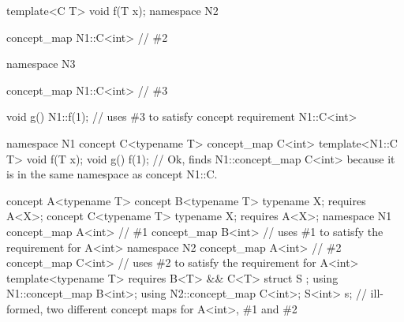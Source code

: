 \documentclass[american]{book}
\begin{document}
\begin{paras}
\begin{codeblock}
{  template<C T> void f(T x);
}
namespace N2 {
  concept_map N1::C<int> { } // \#2

  namespace N3 {
    concept_map N1::C<int> { } // \#3

    void g() { 
      N1::f(1); // uses \#3 to satisfy concept requirement N1::C<int>
    }
  }
}
\end{codeblock}
\addedConcepts{\mbox{\exitexample} \mbox{\exitnote}}

\pnum 
{}
\addedConcepts{\mbox{\enterexample}}
\begin{codeblock}
namespace N1 {
  concept C<typename T> { }
  concept_map C<int> { }
}
template<N1::C T> void f(T x);
void g() { 
  f(1); // Ok, finds N1::concept_map C<int> because it is in the same namespace as concept N1::C.
} 
\end{codeblock}
\addedConcepts{\mbox{\exitexample}}\addedConcepts{\mbox{\exitnote}}

\pnum
{}
\color{addclr}
\begin{codeblock}
concept A<typename T> { }
concept B<typename T> {
  typename X;
  requires A<X>;
}
concept C<typename T> {
  typename X;
  requires A<X>;
}
namespace N1 {
  concept_map A<int> { }  // \#1
  concept_map B<int> { }  // uses \#1 to satisfy the requirement for A<int>
}
namespace N2 {
  concept_map A<int> { }  // \#2
  concept_map C<int> { }  // uses \#2 to satisfy the requirement for A<int>
}
template<typename T> requires B<T> && C<T>
struct S { };
using N1::concept_map B<int>;
using N2::concept_map C<int>;
S<int> s; // ill-formed, two different concept maps for A<int>, \#1 and \#2
\end{codeblock}
\color{black}
\addedConcepts{\mbox{\exitexample}}


\end{paras}
\end{document}
